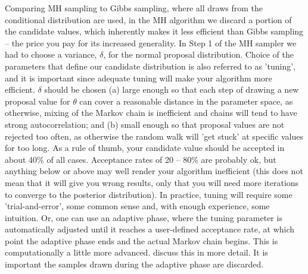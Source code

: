 Comparing MH sampling to Gibbs sampling, where all draws from the
conditional distribution are used, in the MH algorithm we discard a
portion of the candidate values, which inherently makes it less
efficient than Gibbs sampling -- the price you pay for its increased
generality.  In Step 1 of the MH sampler we had to choose a variance,
$\delta$, for the normal proposal distribution. Choice of the
parameters that define our candidate distribution is also referred to
as 'tuning', and it is important since adequate tuning will make your
algorithm more efficient.  $\delta$ should be chosen (a) large enough
so that each step of drawing a new proposal value for $\theta$ can
cover a reasonable distance in the parameter space, as otherwise,
mixing of the Markov chain is inefficient and chains will tend to have
strong autocorrelation; and (b) small enough so that proposal values
are not rejected too often, as otherwise the random walk will 'get
stuck' at specific values for too long.  As a rule of thumb, your
candidate value should be accepted in about 40\% of all
cases. Acceptance rates of 20 -- 80\% are probably ok, but anything
below or above may well render your algorithm inefficient (this does
not mean that it will give you wrong results, only that you will need
more iterations to converge to the posterior distribution). In
practice, tuning will require some 'trial-and-error', some common
sense and, with enough experience, some intuition. Or, one can use an adaptive phase, where the tuning parameter
is automatically adjusted until it reaches a user-defined acceptance
rate, at which point the adaptive phase ends and the actual Markov
chain begins. This is computationally a little more
advanced. \citet{link_barker:2010} discuss this in more detail. It is
important the samples drawn during the adaptive phase are discarded.

